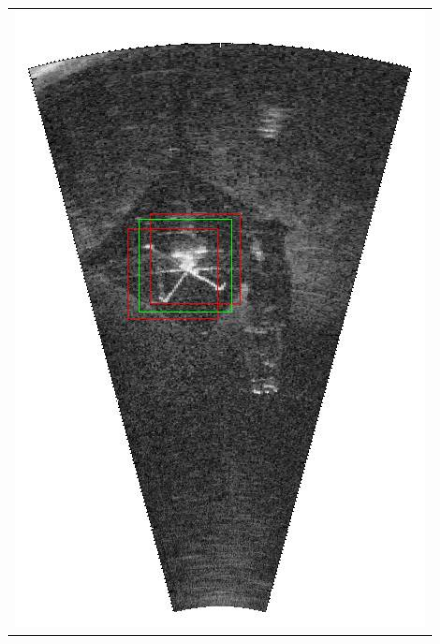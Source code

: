 \begin{figure}[p]
{\begin{tabular}[b]{c}
		\includegraphics[height=0.22\textheight]{chapters/images/proposals/detections/nms070-2016-02-11_070611-frame16021-proposals.jpg}
        \end{tabular}
	}
	

\end{figure}

